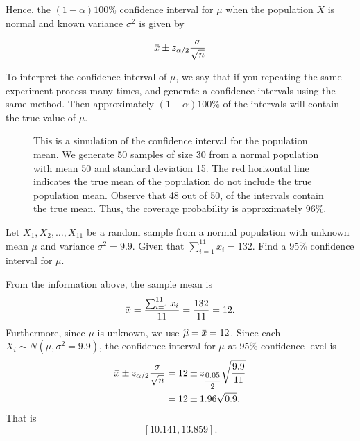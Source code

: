 Hence, the $(1-\alpha)100\%$ confidence interval for $\mu$ when the population $X$ is normal 
and known variance $\sigma^2$ is given by

\begin{equation}
    \ols{x} \pm z_{\alpha / 2} \frac{\sigma}{\sqrt{n}}
\end{equation}

To interpret the confidence interval of $\mu$, we say that 
if you repeating the same experiment process many times, and
generate a confidence intervals using the same method. Then approximately $(1-\alpha)100\%$ of the intervals will contain the true value of $\mu$.
\begin{figure}[!ht]
    \centering
    \caption{This is a simulation of the confidence interval for the population mean. We generate 50 samples of size 30 from a normal population with mean 50 and standard deviation 15.
    The red horizontal line indicates the true mean of the population do not include the true population mean. Observe that 
    48 out of 50, of the intervals contain the true mean. Thus, the coverage probability is approximately 96\%.}
\end{figure}

\begin{example}
    Let $X_1, X_2, \ldots, X_{11}$ be a random sample from a normal population with unknown mean $\mu$ and variance $\sigma^2 = 9.9$.
    Given that $\sum_{i=1}^{11} x_i = 132$. Find a 95\% confidence interval for $\mu$.
\end{example}
\begin{solution}
    From the information above, the sample mean is 
    \[
    \ols{x} = \frac{\sum_{i=1}^{11} x_i}{11} = \frac{132}{11} = 12.
    \]
    Furthermore, since $\mu$ is unknown, we use $\widehat{\mu} = \ols{x} = 12$. Since each $X_i \sim N(\mu, \sigma^2=9.9)$, 
    the confidence interval for $\mu$ at 95\% confidence level is
    \begin{align*}
        \ols{x} \pm z_{\alpha / 2} \frac{\sigma}{\sqrt{n}} &= 12 \pm z_{\mfrac{0.05}{2}} \sqrt{\frac{9.9}{11}} \\
        &= 12 \pm 1.96 \sqrt{0.9}.
    \end{align*}
    That is
    \[
        [10.141, 13.859].
    \]
\end{solution}

